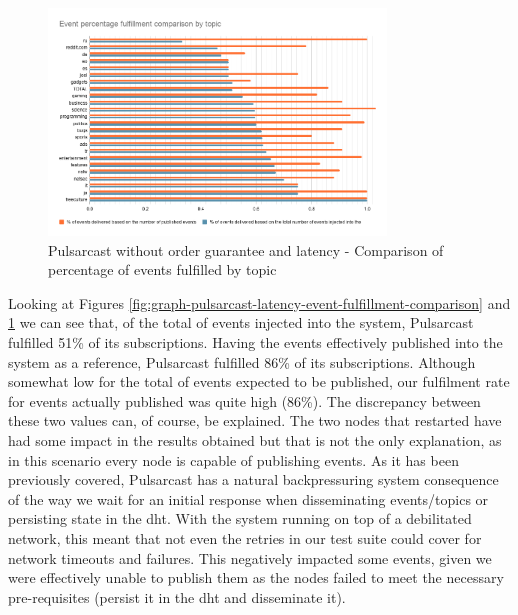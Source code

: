 \begin{figure}[!htb]
  \centering
  \includegraphics[width=0.8\textwidth]{img/graph-pulsarcast-latency-event-percentage-fulfillment-comparison.png}
  \caption{Pulsarcast without order guarantee and latency - Comparison of percentage of events fulfilled by topic}
  \label{fig:graph-pulsarcast-latency-event-percentage-fulfillment-comparison}
\end{figure}

Looking at Figures
\ref{fig:graph-pulsarcast-latency-event-fulfillment-comparison} and
\ref{fig:graph-pulsarcast-latency-event-percentage-fulfillment-comparison} we
can see that, of the total of events injected into the system, Pulsarcast
fulfilled 51\% of its subscriptions. Having the events effectively published
into the system as a reference, Pulsarcast fulfilled 86\% of its subscriptions.
Although somewhat low for the total of events expected to be published, our
fulfilment rate for events actually published was quite high (86\%). The
discrepancy between these two values can, of course, be explained.  The two
nodes that restarted have had some impact in the results obtained but that is
not the only explanation, as in this scenario every node is capable of
publishing events. As it has been previously covered, Pulsarcast has a natural
backpressuring system consequence of the way we wait for an initial response
when disseminating events/topics or persisting state in the \acrshort{dht}.
With the system running on top of a debilitated network, this meant that not
even the retries in our test suite could cover for network timeouts and
failures.  This negatively impacted some events, given we were effectively
unable to publish them as the nodes failed to meet the necessary pre-requisites
(persist it in the \acrshort{dht} and disseminate it).

